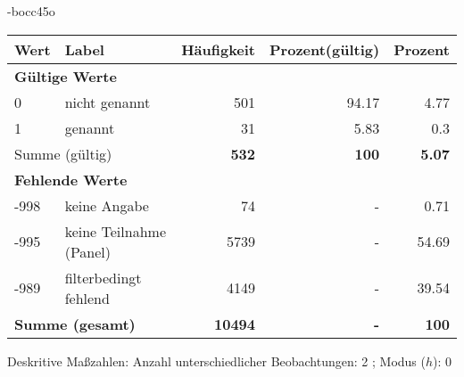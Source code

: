                 \vspace*{-\baselineskip}
					\begin{filecontents}{\jobname-bocc45o}
					\begin{longtable}{lXrrr}
					\toprule
					\textbf{Wert} & \textbf{Label} & \textbf{Häufigkeit} & \textbf{Prozent(gültig)} & \textbf{Prozent} \\
					\endhead
					\midrule
					\multicolumn{5}{l}{\textbf{Gültige Werte}}\\

					0 &
					\multicolumn{1}{X}{ nicht genannt   } &


					  \num{501} &
					  \num[round-mode=places,round-precision=2]{94,17} &
					    \num[round-mode=places,round-precision=2]{4,77} \\

					1 &
					\multicolumn{1}{X}{ genannt   } &


					  \num{31} &
					  \num[round-mode=places,round-precision=2]{5,83} &
					    \num[round-mode=places,round-precision=2]{0,3} \\
					\midrule
					\multicolumn{2}{l}{Summe (gültig)} &
					  \textbf{\num{532}} &
					\textbf{100} &
					  \textbf{\num[round-mode=places,round-precision=2]{5,07}} \\
					\multicolumn{5}{l}{\textbf{Fehlende Werte}}\\
							-998 &
							keine Angabe &
							  \num{74} &
							 - &
							  \num[round-mode=places,round-precision=2]{0,71} \\
							-995 &
							keine Teilnahme (Panel) &
							  \num{5739} &
							 - &
							  \num[round-mode=places,round-precision=2]{54,69} \\
							-989 &
							filterbedingt fehlend &
							  \num{4149} &
							 - &
							  \num[round-mode=places,round-precision=2]{39,54} \\
					\midrule
					\multicolumn{2}{l}{\textbf{Summe (gesamt)}} &
				      \textbf{\num{10494}} &
				    \textbf{-} &
				    \textbf{100} \\
					\bottomrule
					\end{longtable}
					\end{filecontents}
				\label{tableValues:bocc45o}
				\vspace*{-\baselineskip}
                    \begin{noten}
                	    \note{} Deskritive Maßzahlen:
                	    Anzahl unterschiedlicher Beobachtungen: 2%
                	    ; 
                	      Modus ($h$): 0
                     \end{noten}


